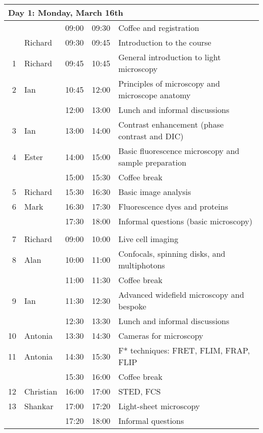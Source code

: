 \documentclass[10pt,a4paper]{memoir}
\begin{document}
  \begin{tabular}{r l r@{ -- }l l}
    \multicolumn{5}{l}{Day 1: Monday, March 16th} \\

    \toprule
    \null & \null     & 09:00 & 09:30 & Coffee and registration \\
    \null & Richard   & 09:30 & 09:45 & Introduction to the course \\
    1     & Richard   & 09:45 & 10:45 & General introduction to light microscopy \\
    2     & Ian       & 10:45 & 12:00 & Principles of microscopy and microscope anatomy \\
    \null & \null     & 12:00 & 13:00 & Lunch and informal discussions \\
    3     & Ian       & 13:00 & 14:00 & Contrast enhancement (phase contrast and DIC) \\
    4     & Ester     & 14:00 & 15:00 & Basic fluorescence microscopy and sample preparation \\
    \null & \null     & 15:00 & 15:30 & Coffee break \\
    5     & Richard   & 15:30 & 16:30 & Basic image analysis \\
    6     & Mark      & 16:30 & 17:30 & Fluorescence dyes and proteins \\
    \null & \null     & 17:30 & 18:00 & Informal questions (basic microscopy) \\

    \addlinespace
    \multicolumn{5}{l}{Day 2: Tuesday, March 17th} \\

    \toprule
    7     & Richard   & 09:00 & 10:00 & Live cell imaging \\
    8     & Alan      & 10:00 & 11:00 & Confocals, spinning disks, and multiphotons \\
    \null & \null     & 11:00 & 11:30 & Coffee break \\
    9     & Ian       & 11:30 & 12:30 & Advanced widefield microscopy and bespoke \\
    \null & \null     & 12:30 & 13:30 & Lunch and informal discussions \\
    10    & Antonia   & 13:30 & 14:30 & Cameras for microscopy \\
    11    & Antonia   & 14:30 & 15:30 & F* techniques: FRET, FLIM, FRAP, FLIP \\
    \null & \null     & 15:30 & 16:00 & Coffee break \\
    12    & Christian & 16:00 & 17:00 & STED, FCS \\
    13    & Shankar   & 17:00 & 17:20 & Light-sheet microscopy \\
    \null & \null     & 17:20 & 18:00 & Informal questions \\


\end{tabular}
\end{document}
